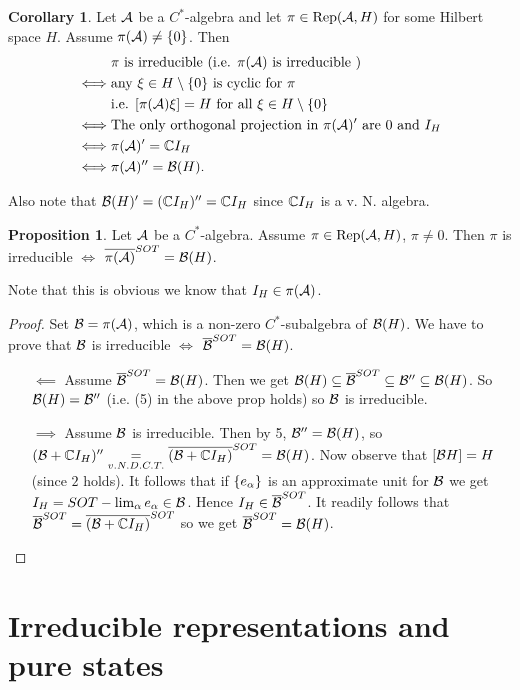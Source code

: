 \documentclass[10pt,english,a4paper]{article}
\theoremstyle{definition}
\newtheorem*{corollary}{Corollary}
\newtheorem*{proposition}{Proposition}
\DeclareMathOperator{\Rep}{Rep}
\begin{document}
\begin{corollary}
    Let $\mathcal{A}$ be a $C^*$-algebra and let $\pi \in \Rep(\As,H)$ for some 
Hilbert space $H$. Assume $\pi(\mathcal{A})\neq \{0\}$.
Then
\begin{align*}
    &\text{$\pi$ is irreducible (i.e. $\pi(\mathcal{A})$ is irreducible )}\\
\iff&\text{any $\xi \in H\setminus\{0\}$ is cyclic for $\pi$} \\
& \text{i.e. $[\pi(\mathcal{A})\xi] =H$ for all $\xi\in H\setminus \{0\}$} \\
\iff& \text{The only orthogonal projection in $\pi(\mathcal{A})'$ are $0$ and $I_H$} \\
\iff& \pi(\mathcal{A})' = \mathbb{C} I_H \\
\iff& \pi(\mathcal{A})'' = \mathcal{B}(H).
\end{align*}
\end{corollary}


Also note that $\mathcal{B}(H)' = (\mathbb{C} I_H)'' = \mathbb{C} I_H$  since $\mathbb{C} I_H$ is a v. N. algebra. 

\begin{proposition} Let $\mathcal{A}$ be a $C^*$-algebra.
    Assume $\pi \in \Rep(\As,H)$, $\pi\neq 0$. Then $\pi$ is irreducible 
$\iff$ $\overline{\pi(\mathcal{A})}^{SOT} = \mathcal{B}(H)$.
\end{proposition}
Note that this is obvious we know that $I_H \in \pi(\mathcal{A})$.
\begin{proof}
    Set $\mathcal{B} = \pi(\mathcal{A})$, which is a non-zero $C^*$-subalgebra of $\mathcal{B}(H)$.
We have to prove that $\mathcal{B}$ is irreducible $\iff$ $\overline{\mathcal{B}}^{SOT} = \mathcal{B}(H)$.
\begin{itemize}
    \item[$\impliedby$] Assume $\overline{\mathcal{B}}^{SOT} = \mathcal{B}(H)$. Then we get 
$\mathcal{B}(H) \subseteq \overline{\mathcal{B}}^{SOT}\subseteq \mathcal{B}''\subseteq \mathcal{B}(H)$. So
$\mathcal{B}(H)= \mathcal{B}''$ (i.e. (5) in the above prop holds) so $\mathcal{B}$ is irreducible.
\item[$\implies$] Assume $\mathcal{B}$ is irreducible. Then by 5, $\mathcal{B}'' = \mathcal{B}(H)$, 
so $(\mathcal{B}+\mathbb{C} I_H)'' \underset{v.N. D.C.T.}{=} \overline{(\mathcal{B} + \mathbb{C} I_H)}^{SOT} = \mathcal{B}(H)$. 
Now observe that $[\mathcal{B} H] = H$ (since $2$ holds). It follows that if 
$\{ e_{\alpha}\}$ is an approximate unit for $\mathcal{B}$ we get $I_H = SOT-\lim_{\alpha}e_{\alpha} \in \mathcal{B}$.
Hence $I_{H} \in \overline{\mathcal{B}}^{SOT}$. It readily follows that 
$\overline{\mathcal{B}}^{SOT} = \overline{(\mathcal{B} + \mathbb{C} I_H)}^{SOT}$ so we get $\overline{\mathcal{B}}^{SOT} = \mathcal{B}(H)$.
\end{itemize}
\end{proof}


\section{Irreducible representations and pure states}
\end{document}
